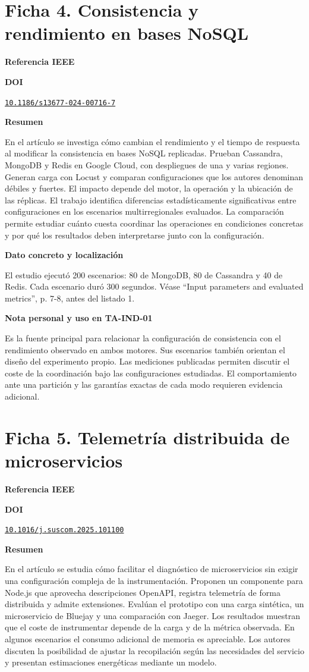 \documentclass[11pt,a4paper]{article}
\newcommand{\fichabloque}[1]{\par\medskip\textbf{#1}\par\nobreak}
\newcommand{\ficharef}[1]{\begin{otherlanguage}{english}\fullcite{#1}\par\end{otherlanguage}}
\newcommand{\fichadoi}[1]{\href{https://doi.org/#1}{\nolinkurl{#1}}}
\begin{document}
\clearpage
\section*{Ficha 4. Consistencia y rendimiento en bases NoSQL}

\fichabloque{Referencia IEEE}
\ficharef{ferreira2024consistencia}

\fichabloque{DOI}
\fichadoi{10.1186/s13677-024-00716-7}

\fichabloque{Resumen}
En el artículo se investiga cómo cambian el rendimiento y el tiempo de respuesta al modificar la consistencia en bases NoSQL replicadas. Prueban Cassandra, MongoDB y Redis en Google Cloud, con despliegues de una y varias regiones. Generan carga con Locust y comparan configuraciones que los autores denominan débiles y fuertes. El impacto depende del motor, la operación y la ubicación de las réplicas. El trabajo identifica diferencias estadísticamente significativas entre configuraciones en los escenarios multirregionales evaluados. La comparación permite estudiar cuánto cuesta coordinar las operaciones en condiciones concretas y por qué los resultados deben interpretarse junto con la configuración.

\fichabloque{Dato concreto y localización}
El estudio ejecutó 200 escenarios: 80 de MongoDB, 80 de Cassandra y 40 de Redis. Cada escenario duró 300 segundos. Véase \enquote{Input parameters and evaluated metrics}, p. 7-8, antes del listado 1.

\fichabloque{Nota personal y uso en TA-IND-01}
Es la fuente principal para relacionar la configuración de consistencia con el rendimiento observado en ambos motores. Sus escenarios también orientan el diseño del experimento propio. Las mediciones publicadas permiten discutir el coste de la coordinación bajo las configuraciones estudiadas. El comportamiento ante una partición y las garantías exactas de cada modo requieren evidencia adicional.

\clearpage
\section*{Ficha 5. Telemetría distribuida de microservicios}

\fichabloque{Referencia IEEE}
\ficharef{otero2025telemetria}

\fichabloque{DOI}
\fichadoi{10.1016/j.suscom.2025.101100}

\fichabloque{Resumen}
En el artículo se estudia cómo facilitar el diagnóstico de microservicios sin exigir una configuración compleja de la instrumentación. Proponen un componente para Node.js que aprovecha descripciones OpenAPI, registra telemetría de forma distribuida y admite extensiones. Evalúan el prototipo con una carga sintética, un microservicio de Bluejay y una comparación con Jaeger. Los resultados muestran que el coste de instrumentar depende de la carga y de la métrica observada. En algunos escenarios el consumo adicional de memoria es apreciable. Los autores discuten la posibilidad de ajustar la recopilación según las necesidades del servicio y presentan estimaciones energéticas mediante un modelo.
\end{document}
